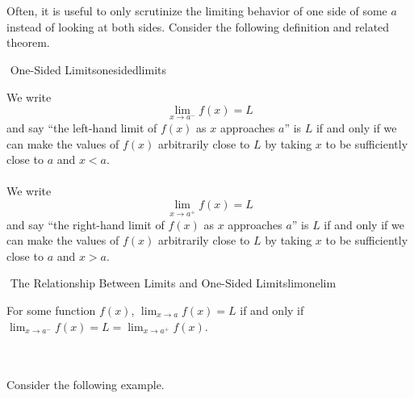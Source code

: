         \pagebreak
        \vphantom
        \\
        \\
        Often, it is useful to only scrutinize the limiting behavior of one side of some \(a\) instead of looking at both sides. Consider the following definition and related theorem.
        \begin{definition}{\Stop\,\,One-Sided Limits}{onesidedlimits}

            We write
            \begin{equation*}
                \lim_{x\to a^-}f(x)=L
            \end{equation*}
            and say ``the left-hand limit of \(f(x)\) as \(x\) approaches \(a\)'' is \(L\) if and only if we can make the values of \(f(x)\) arbitrarily close to \(L\) by taking \(x\) to be sufficiently close to \(a\) and \(x<a\).
            \\
            \\
            We write
            \begin{equation*}
                \lim_{x\to a^+}f(x)=L
            \end{equation*}
            and say ``the right-hand limit of \(f(x)\) as \(x\) approaches \(a\)'' is \(L\) if and only if we can make the values of \(f(x)\) arbitrarily close to \(L\) by taking \(x\) to be sufficiently close to \(a\) and \(x>a\).

        \end{definition}
        \begin{theorem}{\Stop\,\,The Relationship Between Limits and One-Sided Limits}{limonelim}
            
            For some function \(f(x)\), \(\lim_{x\to a}f(x)=L\) if and only if \(\lim_{x\to a^-}f(x)=L=\lim_{x\to a^+}f(x)\).

        \end{theorem}
        \pagebreak
        \vphantom
        \\
        \\
        Consider the following example.
